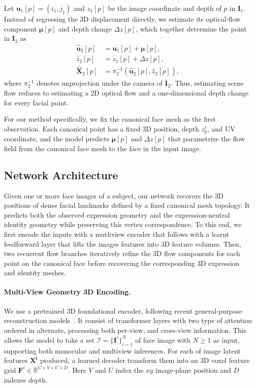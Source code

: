 Let $\mathbf{u}_1[p]=(i_1,j_1)$ and $z_1[p]$ be the image coordinate and depth
of $p$ in $\mathbf{I}_1$. Instead of regressing the 3D displacement directly,
we estimate its optical-flow component $\boldsymbol{\mu}[p]$ and depth change
$\Delta z[p]$, which together determine the point in $\mathbf{I}_2$ as
\begin{align}
    \hat{\mathbf{u}}_2[p]
        &= \mathbf{u}_1[p]+\boldsymbol{\mu}[p], \\
    \hat z_2[p]
        &= z_1[p]+\Delta z[p], \\
    \hat{\mathbf{X}}_2[p]
        &= \pi_2^{-1}\!\left(\hat{\mathbf{u}}_2[p],\hat z_2[p]\right),
    \label{eq:flow_unprojection}
\end{align}
where $\pi_2^{-1}$ denotes unprojection under the camera of
$\mathbf{I}_2$. Thus, estimating scene flow reduces to estimating a 2D optical
flow and a one-dimensional depth change for every facial point.

For our method specifically, we fix the canonical face mesh as the first
observation.
Each canonical point has a fixed 3D position, depth $z_p^c$, and UV coordinate,
and the model predicts $\boldsymbol{\mu}[p]$ and $\Delta z[p]$ that parametrize
the flow field from the canonical face mesh to the face in the input image.


\subsection{Network Architecture}
\label{sec:network_architecture}

Given one or more face images of a subject, our network recovers the 3D
positions of dense facial landmarks defined by a fixed canonical mesh topology.
It predicts both the observed expression geometry and the expression-neutral
identity geometry while preserving this vertex correspondence.
To this end, we first encode the inputs with a mutliview encoder that follows with
a learnt feedforward layer that lifts the images features into 3D feature volumes.
Then, two recurrent flow branches iteratively refine the 3D flow components
for each point on the canonical face before recovering the corresponding 3D expression
and identity meshes.

\paragraph{Multi-View Geometry 3D Encoding.}
\label{sec:multiview_encoder}
We use a pretrained 3D foundational encoder, following recent general-purpose reconstruction
models~\cite{wang2026vggtomega,depthanything3,pi3}. It consist of transformer layers with two type
of attention ordered in alternate, processing both per-view, and cross-view information.
This allows the model to take a set $\mathcal{I}=\{\mathbf{I}^i\}_{i=1}^{N}$ of face image
with $N\geq1$ as input, supporting both monocular and multiview inferences. For each of image latent features $\mathbf{X^i}$ produced,
a learned decoder transform them into an 3D voxel feature grid $\mathbf{F}^i\in\mathbb{R}^{C\times V\times U\times D}$.
Here $V$ and $U$ index the $xy$ image-plane position and $D$ indexes depth.

